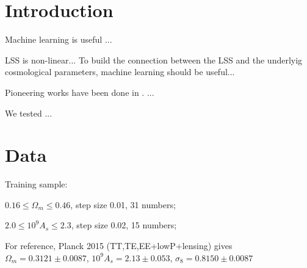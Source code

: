 \documentclass[twocolumn]{aastex61}
\begin{document}



\section{Introduction}

Machine learning is useful ...

LSS is non-linear... 
To build the connection between the LSS and the underlyig cosmological parameters, machine learning should be useful...

Pioneering works have been done in \citep{Ravanbakhsh2017}. ...

We tested ...

\section{Data}

Training sample:

$0.16 \leq \Omega_m \leq 0.46$, step size 0.01, 31 numbers;

$2.0 \leq 10^9 A_s \leq 2.3$, step size 0.02, 15 numbers;


For reference, Planck 2015 (TT,TE,EE+lowP+lensing) gives 
$\Omega_m = 0.3121 \pm 0.0087$, 
$10^9 A_s = 2.13 \pm 0.053$,
$\sigma_8 = 0.8150 \pm 0.0087$
\end{document}
